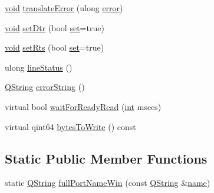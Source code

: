 \begin{DoxyCompactItemize}
\item 
\hyperlink{group___u_a_v_objects_plugin_ga444cf2ff3f0ecbe028adce838d373f5c}{void} \hyperlink{class_qext_serial_port_ad9e65fcd3bfd765b7425f6aa81cbb160}{translate\-Error} (ulong \hyperlink{uavobjecttemplate_8m_ae37d8f40ba76a59d04a674d824e8721f}{error})
\item 
\hyperlink{group___u_a_v_objects_plugin_ga444cf2ff3f0ecbe028adce838d373f5c}{void} \hyperlink{class_qext_serial_port_a0de93c64cb2e2d663ddd396294e25356}{set\-Dtr} (bool \hyperlink{analyze_raw_8m_a11671e12e7b3fc5881313758d6cc0b45}{set}=true)
\item 
\hyperlink{group___u_a_v_objects_plugin_ga444cf2ff3f0ecbe028adce838d373f5c}{void} \hyperlink{class_qext_serial_port_a699ca97dbee732d19ff224de5c91befe}{set\-Rts} (bool \hyperlink{analyze_raw_8m_a11671e12e7b3fc5881313758d6cc0b45}{set}=true)
\item 
ulong \hyperlink{class_qext_serial_port_aacdcfc0dd421b7d21a1d58840091ec8d}{line\-Status} ()
\item 
\hyperlink{group___u_a_v_objects_plugin_gab9d252f49c333c94a72f97ce3105a32d}{Q\-String} \hyperlink{class_qext_serial_port_aaafe63e85bf7e47ed8442be686e3d262}{error\-String} ()
\item 
virtual bool \hyperlink{class_qext_serial_port_aa9e0de517b23cf177bc6d9aec2dbc5b0}{wait\-For\-Ready\-Read} (\hyperlink{ioapi_8h_a787fa3cf048117ba7123753c1e74fcd6}{int} msecs)
\item 
virtual qint64 \hyperlink{class_qext_serial_port_a25df6d85a3758ef20744adb2c6515fcf}{bytes\-To\-Write} () const 
\end{DoxyCompactItemize}
\subsection*{Static Public Member Functions}
\begin{DoxyCompactItemize}
\item 
static \hyperlink{group___u_a_v_objects_plugin_gab9d252f49c333c94a72f97ce3105a32d}{Q\-String} \hyperlink{class_qext_serial_port_adff0599a3a0d6d17dab05a85443b1026}{full\-Port\-Name\-Win} (const \hyperlink{group___u_a_v_objects_plugin_gab9d252f49c333c94a72f97ce3105a32d}{Q\-String} \&\hyperlink{glext_8h_ad977737dfc9a274a62741b9500c49a32}{name})
\end{DoxyCompactItemize}

